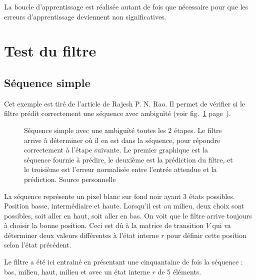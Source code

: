La boucle d'apprentissage est réalisée autant de fois que nécessaire pour que
les erreurs d'apprentissage deviennent non significatives.



\section{Test du filtre} %
\label{sec:Test du filtre}

\subsection{Séquence simple} %
\label{sub:Sequence simple}

Cet exemple est tiré de l'article de Rajesh P. N. Rao. Il permet de vérifier si
le filtre prédit correctement une séquence avec ambiguïté (voir
fig.~\ref{fig:sequence_simple} page~\pageref{fig:sequence_simple}).

\begin{figure}[ht]
   \begin{center}
   \end{center}
   \caption[Prédiction de séquence simple]{Séquence simple avec une ambiguïté
   toutes les 2 étapes. Le filtre arrive à déterminer où il en est dans la
   séquence, pour répondre correctement à l'étape suivante. Le premier graphique est
   la séquence fournie à prédire, le deuxième est la prédiction du filtre, et le
   troisième est l'erreur normalisée entre l'entrée attendue et la prédiction.
   Source personnelle}
   \label{fig:sequence_simple}
\end{figure}

La séquence représente un pixel blanc sur fond noir ayant 3 états possibles.
Position basse, intermédiaire et haute. Lorsqu'il est au milieu, deux choix sont
possibles, soit aller en haut, soit aller en bas. On voit que le filtre arrive
toujours à choisir la bonne position. Ceci est dû à la matrice de transition
$V$ qui va déterminer deux valeurs différentes à l'état interne $r$ pour définir
cette position selon l'état précédent\cite{Rao1999}.

Le filtre a été ici entrainé en présentant une cinquantaine de fois la séquence :
bas, milieu, haut, milieu et avec un état interne $r$ de 5 éléments.


